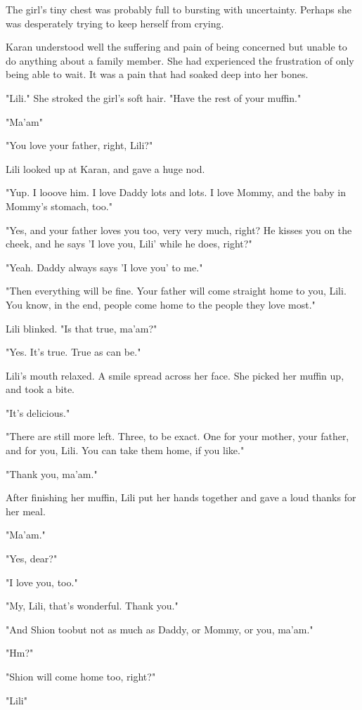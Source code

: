 The girl's tiny chest was probably full to bursting with uncertainty.
Perhaps she was desperately trying to keep herself from crying.~

Karan understood well the suffering and pain of being concerned but
unable to do anything about a family member. She had experienced the
frustration of only being able to wait. It was a pain that had soaked
deep into her bones.

"Lili." She stroked the girl's soft hair. "Have the rest of your
muffin."

"Ma'am\el "

"You love your father, right, Lili?"

Lili looked up at Karan, and gave a huge nod.

"Yup. I looove him. I love Daddy lots and lots. I love Mommy, and the
baby in Mommy's stomach, too."

"Yes, and your father loves you too, very very much, right? He kisses
you on the cheek, and he says 'I love you, Lili' while he does, right?"

"Yeah. Daddy always says 'I love you' to me."

"Then everything will be fine. Your father will come straight home to
you, Lili. You know, in the end, people come home to the people they
love most."

Lili blinked. "Is that true, ma'am?"

"Yes. It's true. True as can be."

Lili's mouth relaxed. A smile spread across her face. She picked her
muffin up, and took a bite.

"It's delicious."

"There are still more left. Three, to be exact. One for your mother,
your father, and for you, Lili. You can take them home, if you like."

"Thank you, ma'am."

After finishing her muffin, Lili put her hands together and gave a loud
thanks for her meal.

"Ma'am."

"Yes, dear?"

"I love you, too."

"My, Lili, that's wonderful. Thank you."

"And Shion too\el but not as much as Daddy, or Mommy, or you, ma'am."

"Hm?"

"Shion will come home too, right?"

"Lili\el "

